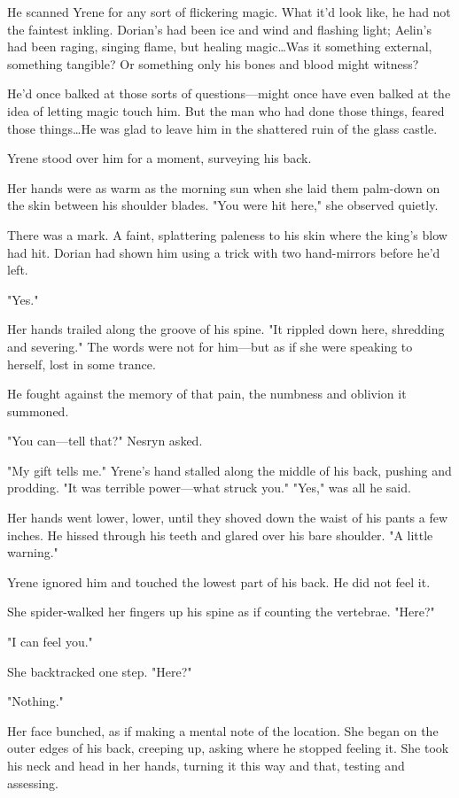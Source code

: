 He scanned Yrene for any sort of flickering magic.
What it'd look like, he had not the faintest inkling.
Dorian's had been ice and wind and flashing light; Aelin's had been raging, singing flame, but healing magic\ldots Was it something external, something tangible?
Or something only his bones and blood might witness?

He'd once balked at those sorts of questions---might once have even balked at the idea of letting magic touch him.
But the man who had done those things, feared those things\ldots He was glad to leave him in the shattered ruin of the glass castle.

Yrene stood over him for a moment, surveying his back.

Her hands were as warm as the morning sun when she laid them palm-down on the skin between his shoulder blades.
"You were hit here," she observed quietly.

There was a mark.
A faint, splattering paleness to his skin where the king's blow had hit.
Dorian had shown him using a trick with two hand-mirrors before he'd left.

"Yes."

Her hands trailed along the groove of his spine.
"It rippled down here, shredding and severing."
The words were not for him---but as if she were speaking to herself, lost in some trance.

He fought against the memory of that pain, the numbness and oblivion it summoned.

"You can---tell that?"
Nesryn asked.

"My gift tells me."
Yrene's hand stalled along the middle of his back, pushing and prodding.
"It was terrible power---what struck you."
"Yes," was all he said.

Her hands went lower, lower, until they shoved down the waist of his pants a few inches.
He hissed through his teeth and glared over his bare shoulder.
"A little warning."

Yrene ignored him and touched the lowest part of his back.
He did not feel it.

She spider-walked her fingers up his spine as if counting the vertebrae.
"Here?"

"I can feel you."

She backtracked one step.
"Here?"

"Nothing."

Her face bunched, as if making a mental note of the location.
She began on the outer edges of his back, creeping up, asking where he stopped feeling it.
She took his neck and head in her hands, turning it this way and that, testing and assessing.

